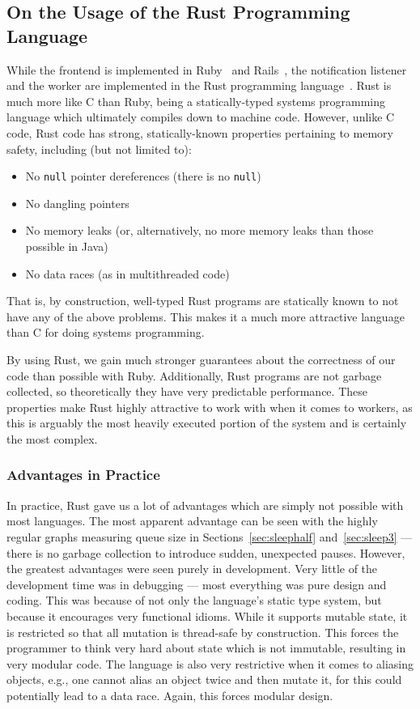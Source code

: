 \documentclass{scrartcl}
\begin{document}
\subsection{On the Usage of the Rust Programming Language}
While the frontend is implemented in Ruby~\cite{ruby} and Rails~\cite{rails}, the notification listener and the worker are implemented in the Rust programming language~\cite{rust}.
Rust is much more like C than Ruby, being a statically-typed systems programming language which ultimately compiles down to machine code.
However, unlike C code, Rust code has strong, statically-known properties pertaining to memory safety, including (but not limited to):
\begin{itemize}
  \item No \texttt{null} pointer dereferences (there is no \texttt{null})
  \item No dangling pointers
  \item No memory leaks (or, alternatively, no more memory leaks than those possible in Java)
  \item No data races (as in multithreaded code)
\end{itemize}
That is, by construction, well-typed Rust programs are statically known to not have any of the above problems.
This makes it a much more attractive language than C for doing systems programming.

By using Rust, we gain much stronger guarantees about the correctness of our code than possible with Ruby.
Additionally, Rust programs are not garbage collected, so theoretically they have very predictable performance.
These properties make Rust highly attractive to work with when it comes to workers, as this is arguably the most heavily executed portion of the system and is certainly the most complex.

\subsubsection{Advantages in Practice}
In practice, Rust gave us a lot of advantages which are simply not possible with most languages.
The most apparent advantage can be seen with the highly regular graphs measuring queue size in Sections~\ref{sec:sleephalf} and~\ref{sec:sleep3} --- there is no garbage collection to introduce sudden, unexpected pauses.
However, the greatest advantages were seen purely in development.
Very little of the development time was in debugging --- most everything was pure design and coding.
This was because of not only the language's static type system, but because it encourages very functional idioms.
While it supports mutable state, it is restricted so that all mutation is thread-safe by construction.
This forces the programmer to think very hard about state which is not immutable, resulting in very modular code.
The language is also very restrictive when it comes to aliasing objects, e.g., one cannot alias an object twice and then mutate it, for this could potentially lead to a data race.
Again, this forces modular design.
\end{document}
